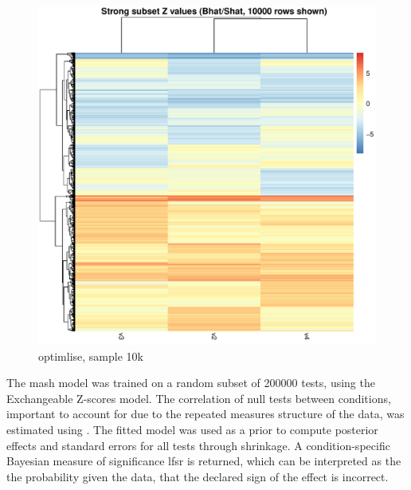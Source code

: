 \begin{figure}
    \centering
    \includegraphics[width=1.0\textwidth,page=1]{mainmatter/figures/chapter_03/mash_mega/mashr.strong_subset_zval_heatmap.cisDist_1e6.sampleAcThresh_15.randomSubsetN_200000.pdf}
    \caption{optimlise, sample 10k}
    \label{fig:hird_mashr_strongSubset_Z_mega}
\end{figure}

The mash model was trained on a random subset of 200000 tests, using the Exchangeable Z-scores model.
The correlation of null tests between conditions, important to account for due to the repeated measures structure of the data, was estimated using .
The fitted model was used as a prior to compute posterior effects and standard errors for all tests through shrinkage.
%
A condition-specific Bayesian measure of significance \gls{lfsr} is returned, which can be interpreted as the the probability given the data, that the declared sign of the effect is incorrect.

